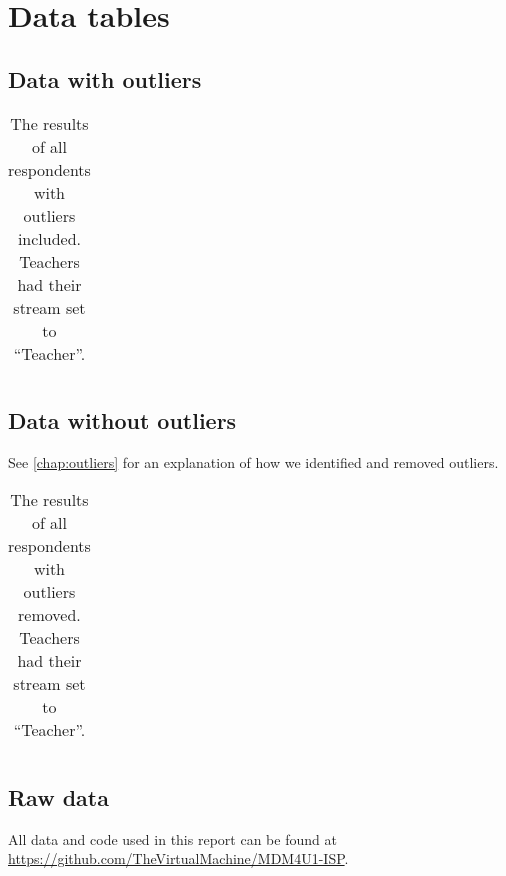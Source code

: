 \chapter{Data tables}

\section{Data with outliers}
\begin{longtable}{rrrlll}
	\caption{The results of all respondents with outliers included. Teachers had their stream set to ``Teacher''.}
	\label{table:outliers}
	
\end{longtable}

\section{Data without outliers}
See \vref{chap:outliers} for an explanation of how we identified and removed outliers.
\begin{longtable}{rrrlll}
	\caption{The results of all respondents with outliers removed. Teachers had their stream set to ``Teacher''.}
	\label{table:noOutliers}
	
\end{longtable}

\section{Raw data}
All data and code used in this report can be found at \url{https://github.com/TheVirtualMachine/MDM4U1-ISP}.

